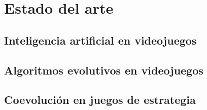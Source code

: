 \chapter{Estado del arte} \label{chap:antecedentes}


\section{Inteligencia artificial en videojuegos} \label{sec:ia_videojuegos}


\section{Algoritmos evolutivos en videojuegos} \label{sec:estado_arte}

\section{Coevolución en juegos de estrategia} \label{sec:trabajos_relacionados}
